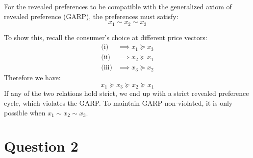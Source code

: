\documentclass{article}
\begin{document}
For the revealed preferences to be compatible with the generalized axiom of revealed preference (GARP),
the preferences must satisfy: $$x_1 \sim x_2 \sim x_3$$

To show this, recall the consumer's choice at different price vectors:
\begin{align*}
    \textrm{(i)} & \implies x_1 \succeq x_3 \\
    \textrm{(ii)} & \implies x_2 \succeq x_1 \\
    \textrm{(iii)} & \implies x_3 \succeq x_2
\end{align*}
Therefore we have: $$ x_1 \succeq x_3 \succeq x_2 \succeq x_1 $$
If any of the two relations hold strict, we end up with a strict revealed preference cycle, 
which violates the GARP. To maintain GARP non-violated, it is only possible when $x_1 \sim x_2 \sim x_3$.\\

\section*{Question 2}
\end{document}
